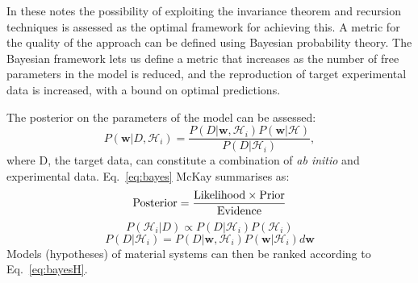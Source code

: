 In these notes the possibility of exploiting the invariance theorem 
and recursion techniques is assessed as the optimal framework
for achieving this. A metric for the quality of the approach can be defined using 
Bayesian probability theory. The Bayesian framework lets us define a metric 
that increases as the number of free parameters in the model is reduced,
and the reproduction of target experimental data is increased, with a bound on optimal predictions.

The posterior on the parameters of the model can be assessed:
%
\begin{equation}
\label{eq:bayes}
P(\mathbf{w}|D, \mathcal{H}_{i}) = \frac{P(D|\mathbf{w}, \mathcal{H}_{i})P(\mathbf{w}|\mathcal{H})}{P(D|\mathcal{H}_{i})},
\end{equation}
%
where D, the target data, can constitute a combination of {\it ab initio} and experimental data. Eq.~\ref{eq:bayes}
McKay summarises as:
\begin{equation}
{\rm Posterior} = \frac{{\rm Likelihood} \times {\rm Prior}}{{\rm Evidence}}
\end{equation}
%
\begin{equation}
\label{eq:bayesH}
P(\mathcal{H}_{i}|D) \propto P(D|\mathcal{H}_{i})P(\mathcal{H}_{i})
\end{equation}
%
\begin{equation}
\label{eq:bayesH}
P(D|\mathcal{H}_{i}) = P(D|\mathbf{w}, \mathcal{H}_{i})P(\mathbf{w}|\mathcal{H}_{i})d\mathbf{w}
\end{equation}
%
Models (hypotheses) of material systems can then be ranked according to Eq.~\ref{eq:bayesH}.

